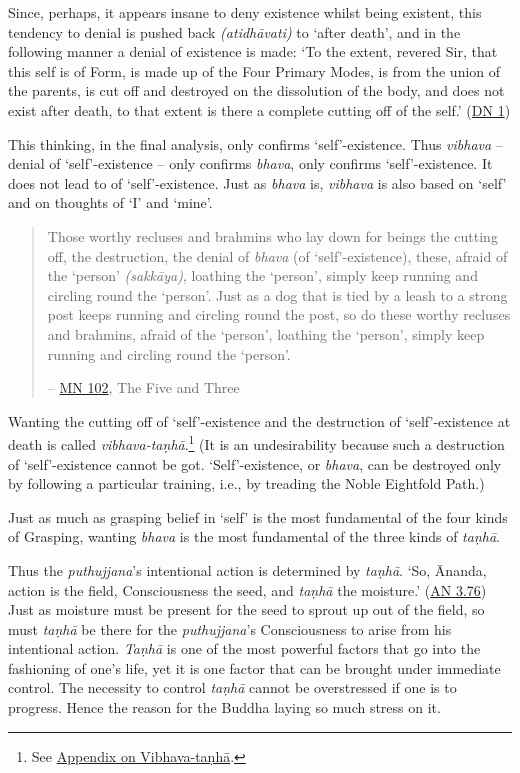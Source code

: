 Since, perhaps, it appears insane to deny existence whilst being existent, this tendency to denial is pushed back \emph{(atidhāvati)} to `after death', and in the following manner a denial of existence is made: `To the extent, revered Sir, that this self is of Form, is made up of the Four Primary Modes, is from the union of the parents, is cut off and destroyed on the dissolution of the body, and does not exist after death, to that extent is there a complete cutting off of the self.' (\href{https://suttacentral.net/dn1/en/bodhi}{DN 1})

This thinking, in the final analysis, only confirms `self'-existence. Thus \emph{vibhava} -- denial of `self'-existence -- only confirms \emph{bhava}, only confirms `self'-existence. It does not lead to  of `self'-existence. Just as \emph{bhava} is, \emph{vibhava} is also based on `self' and on thoughts of `I' and `mine'.

\begin{quote}
Those worthy recluses and brahmins who lay down for beings the cutting off, the destruction, the denial of \emph{bhava} (of `self'-existence), these, afraid of the `person' \emph{(sakkāya)}, loathing the `person', simply keep running and circling round the `person'. Just as a dog that is tied by a leash to a strong post keeps running and circling round the post, so do these worthy recluses and brahmins, afraid of the `person', loathing the `person', simply keep running and circling round the `person'.

 -- \href{https://suttacentral.net/mn102/en/sujato}{MN 102}, The Five and Three
\end{quote}

Wanting the cutting off of `self'-existence and the destruction of `self'-existence at death is called \emph{vibhava-taṇhā}.\footnote{See \href{ch-99-appendix.xml\#vibhava-tanha}{Appendix on Vibhava-taṇhā}.} (It is an undesirability because such a destruction of `self'-existence cannot be got. `Self'-existence, or \emph{bhava}, can be destroyed only by following a particular training, i.e., by treading the Noble Eightfold Path.)

Just as much as grasping belief in `self' is the most fundamental of the four kinds of Grasping, wanting \emph{bhava} is the most fundamental of the three kinds of \emph{taṇhā}.

Thus the \emph{puthujjana}'s intentional action is determined by \emph{taṇhā}. `So, Ānanda, action is the field, Consciousness the seed, and \emph{taṇhā} the moisture.' (\href{https://suttacentral.net/an3.76/en/thanissaro}{AN 3.76}) Just as moisture must be present for the seed to sprout up out of the field, so must \emph{taṇhā} be there for the \emph{puthujjana}'s Consciousness to arise from his intentional action. \emph{Taṇhā} is one of the most powerful factors that go into the fashioning of one's life, yet it is one factor that can be brought under immediate control. The necessity to control \emph{taṇhā} cannot be overstressed if one is to progress. Hence the reason for the Buddha laying so much stress on it.

